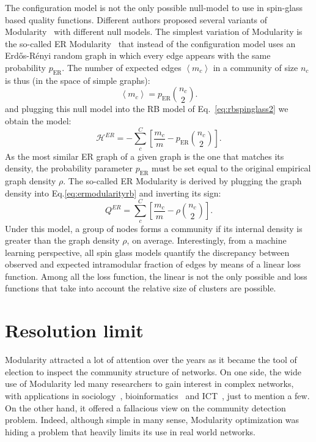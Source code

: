 The configuration model is not the only possible null-model to use in spin-glass based quality functions. Different authors proposed several variants of Modularity~\cite{ronhovde2010,ronhovde2009,traag2011} with different null models.
The simplest variation of Modularity is the so-called ER Modularity~\cite{traag2015} that instead of the configuration model uses an Erd\H{o}s-Rényi random graph in which every edge appears with the same probability $p_{\textrm{ER}}$. The number of expected edges $\left< m_c \right>$ in a community of size $n_c$ is thus (in the space of simple graphs):
\begin{equation}
\left< m_c \right> = p_{\textrm{ER}}\binom{n_c}{2}.
\end{equation}
and plugging this null model into the RB model of Eq.~\ref{eq:rbspinglass2} we obtain the model:
\begin{equation}\label{eq:ermodularityrb}
\mathcal{H}^{ER} = -\sum \limits_c^C \left[\frac{m_c}{m}  - p_{\textrm{ER}}\binom{n_c}{2} \right].
\end{equation}
As the most similar ER graph of a given graph is the one that matches its density, the probability parameter $p_{\textrm{ER}}$ must be set equal to the original empirical graph density $\rho$. The so-called ER Modularity is derived by plugging the graph density into Eq.\ref{eq:ermodularityrb} and inverting its sign: 
\begin{equation}
Q^{ER} = \sum \limits_c^C \left[\frac{m_c}{m}  - \rho \binom{n_c}{2} \right].
\end{equation}
Under this model, a group of nodes forms a community if its internal density is greater than the graph density $\rho$, on average.
Interestingly, from a machine learning perspective, all spin glass models quantify the discrepancy between observed and expected intramodular fraction of edges by means of a linear loss function. Among all the loss function, the linear is not the only possible and loss functions that take into account the relative size of clusters are possible.


\section{Resolution limit}\label{sec:resolutionlimit}
Modularity attracted a lot of attention over the years as it became the tool of election to inspect the community structure of networks.
On one side, the wide use of Modularity led many researchers to gain interest in complex networks, with applications in sociology~\cite{li2008tag}, bioinformatics~\cite{saracc2012topology} and ICT~\cite{java2007we,leskovec2007dynamics}, just to mention a few. On the other hand, it offered a fallacious view on the community detection problem.
Indeed, although simple in many sense, Modularity optimization was hiding a problem that heavily limits its use in real world networks.

